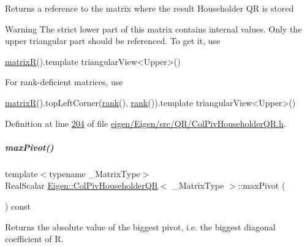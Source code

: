 \begin{DoxyReturn}{Returns}
a reference to the matrix where the result Householder QR is stored 
\end{DoxyReturn}
\begin{DoxyWarning}{Warning}
The strict lower part of this matrix contains internal values. Only the upper triangular part should be referenced. To get it, use 
\begin{DoxyCode}
\hyperlink{group___q_r___module_a44c534d47bde6b67ce4b5247d142ef30}{matrixR}().template triangularView<Upper>() 
\end{DoxyCode}
 For rank-\/deficient matrices, use 
\begin{DoxyCode}
\hyperlink{group___q_r___module_a44c534d47bde6b67ce4b5247d142ef30}{matrixR}().topLeftCorner(\hyperlink{group___q_r___module_a2a59aaa689613ce5ef0c9130ad33940e}{rank}(), \hyperlink{group___q_r___module_a2a59aaa689613ce5ef0c9130ad33940e}{rank}()).template triangularView<Upper>()
\end{DoxyCode}
 
\end{DoxyWarning}


Definition at line \hyperlink{eigen_2_eigen_2src_2_q_r_2_col_piv_householder_q_r_8h_source_l00204}{204} of file \hyperlink{eigen_2_eigen_2src_2_q_r_2_col_piv_householder_q_r_8h_source}{eigen/\+Eigen/src/\+Q\+R/\+Col\+Piv\+Householder\+Q\+R.\+h}.

\mbox{\label{group___q_r___module_aac8c43d720170980f582d01494df9e8f}} 
\subparagraph{\texorpdfstring{max\+Pivot()}{maxPivot()}\hspace{0.1cm}{\footnotesize\ttfamily [1/2]}}
{\footnotesize\ttfamily template$<$typename \+\_\+\+Matrix\+Type$>$ \\
Real\+Scalar \hyperlink{group___q_r___module_class_eigen_1_1_col_piv_householder_q_r}{Eigen\+::\+Col\+Piv\+Householder\+QR}$<$ \+\_\+\+Matrix\+Type $>$\+::max\+Pivot (\begin{DoxyParamCaption}{ }\end{DoxyParamCaption}) const\hspace{0.3cm}{\ttfamily [inline]}}

\begin{DoxyReturn}{Returns}
the absolute value of the biggest pivot, i.\+e. the biggest diagonal coefficient of R. 
\end{DoxyReturn}


